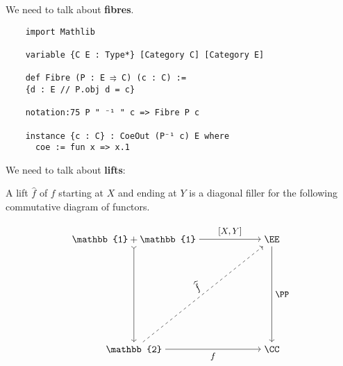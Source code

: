 \documentclass[landscape]{slides}
\begin{document}


\begin{slide}
  \restoregeometry
  We need to talk about \textbf{fibres}. 
  \par{}\baselineskip
  \begin{lstlisting}
    import Mathlib
    
    variable {C E : Type*} [Category C] [Category E] 

    def Fibre (P : E ⥤ C) (c : C) :=
    {d : E // P.obj d = c}

    notation:75 P " ⁻¹ " c => Fibre P c

    instance {c : C} : CoeOut (P⁻¹ c) E where
      coe := fun x => x.1
  \end{lstlisting}

\end{slide}  


\begin{slide}
  \restoregeometry
  We need to talk about \textbf{lifts}: 


  A lift $\widehat{f}$ of $f$ starting at $X$ and ending at $Y$ is a diagonal filler for the following commutative diagram of functors. 

  \par{}\baselineskip 
  \[
  \begin{tikzpicture}[scale=2]
  \node (lu) at (0,2) {$\mathbb{1} + \mathbb{1}$};
  \node (ld) at (0,0) {$\mathbb{2}$};
  \node (ru) at (2.5,2) {$\EE$};
  \node (rd) at (2.5,0) {$\CC$};
  \draw[>->]
  (lu) to node(e0){} node[left] {}  (ld);
  \draw[->] 
  (lu) to node(e1){} node[above] {\small $[X,Y]$}  (ru);
  \draw[->] 
  (ru) to node(e2){} node[right] {\small $\PP$}  (rd);
  \draw[->] 
  (ld) to node(e3){} node[below] {\small $f$}  (rd);
  \draw[->,dashed]
  (ld) to node(e4){} node[above, sloped] {$\widehat{f}$} (ru);
  \end{tikzpicture}
  \]  

\end{slide}  
\end{document}
